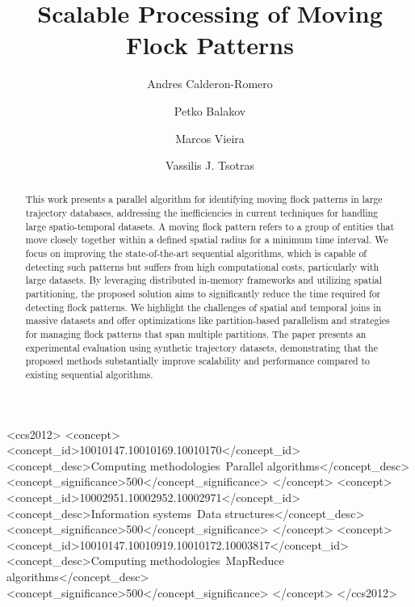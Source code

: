 \documentclass[article,screen]{acmart}
\begin{document}
\title{Scalable Processing of Moving Flock Patterns}
\author{Andres Calderon-Romero}

\author{Petko Balakov}

\author{Marcos Vieira}

\author{Vassilis J. Tsotras}

\renewcommand{\shortauthors}{Calderon, et al.}

\begin{abstract}
This work presents a parallel algorithm for identifying moving flock patterns in large trajectory databases, addressing the inefficiencies in current techniques for handling large spatio-temporal datasets. A moving flock pattern refers to a group of entities that move closely together within a defined spatial radius for a minimum time interval. We focus on improving the state-of-the-art sequential algorithms, which is capable of detecting such patterns but suffers from high computational costs, particularly with large datasets. By leveraging distributed in-memory frameworks and utilizing spatial partitioning, the proposed solution aims to significantly reduce the time required for detecting flock patterns. We highlight the challenges of spatial and temporal joins in massive datasets and offer optimizations like partition-based parallelism and strategies for managing flock patterns that span multiple partitions. The paper presents an experimental evaluation using synthetic trajectory datasets, demonstrating that the proposed methods substantially improve scalability and performance compared to existing sequential algorithms.

\end{abstract}

\begin{CCSXML}
<ccs2012>
   <concept>
       <concept_id>10010147.10010169.10010170</concept_id>
       <concept_desc>Computing methodologies~Parallel algorithms</concept_desc>
       <concept_significance>500</concept_significance>
       </concept>
   <concept>
       <concept_id>10002951.10002952.10002971</concept_id>
       <concept_desc>Information systems~Data structures</concept_desc>
       <concept_significance>500</concept_significance>
       </concept>
   <concept>
       <concept_id>10010147.10010919.10010172.10003817</concept_id>
       <concept_desc>Computing methodologies~MapReduce algorithms</concept_desc>
       <concept_significance>500</concept_significance>
       </concept>
 </ccs2012>
\end{CCSXML}
\end{document}
